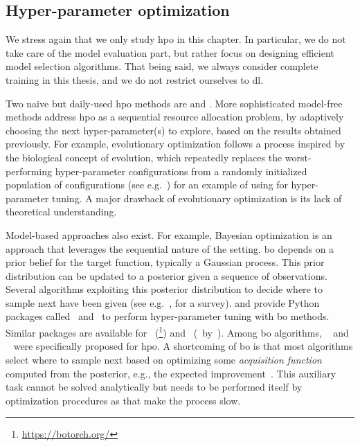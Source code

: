 \subsection{Hyper-parameter optimization}\label{sec:dttts.survey.hpo}

We stress again that we only study \gls{hpo} in this chapter. In particular, we do not take care of the model evaluation part, but rather focus on designing efficient model selection algorithms. That being said, we always consider complete training in this thesis, and we do not restrict ourselves to \gls{dl}.

Two naive but daily-used \gls{hpo} methods are \Grid and \Random. More sophisticated model-free methods address \gls{hpo} as a sequential resource allocation problem, by adaptively choosing the next hyper-parameter(s) to explore, based on the results obtained previously. For example, evolutionary optimization follows a process inspired by the biological concept of evolution, which repeatedly replaces the worst-performing hyper-parameter configurations from a randomly initialized population of configurations (see e.g.~\citealt{loshchilov2016cmaes}) for an example of using \CMAES for hyper-parameter tuning. A major drawback of evolutionary optimization is its lack of theoretical understanding.

Model-based approaches also exist. For example, Bayesian optimization is an approach that leverages the sequential nature of the setting. \gls{bo} depends on a prior belief for the target function, typically a Gaussian process. This prior distribution can be updated to a posterior given a sequence of observations. Several algorithms exploiting this posterior distribution to decide where to sample next have been given (see e.g.~\citealt{shahriari2016loop}, for a survey). \citet{snoek2012spearmint} and \citet{klein2017robo} provide Python packages called \Spearmint\ and \RoBO\ to perform hyper-parameter tuning with \gls{bo} methods. Similar packages are available for \PyTorch\ (\BoTorch\footnote{\url{https://botorch.org/}}) and \TensorFlow\ (\flow\ by~\citealt{knudde2017gpflowopt}). Among \gls{bo} algorithms, \TPE~\citep{bergstra2011tpe} and \SMAC~\citep{hutter2011smac} were specifically proposed for \gls{hpo}. A shortcoming of \gls{bo} is that most algorithms select where to sample next based on optimizing some \emph{acquisition function} computed from the posterior, e.g., the expected improvement~\citep{jones1998ei}. This auxiliary task cannot be solved analytically but needs to be performed itself by optimization procedures as \LBFGS that make the process slow. %

